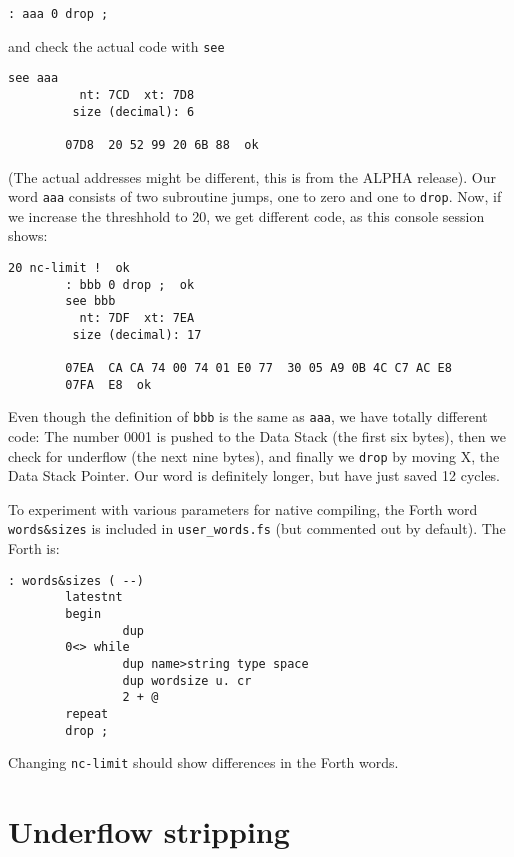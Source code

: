 \begin{lstlisting}[frame=single]
        : aaa 0 drop ;
\end{lstlisting}

\noindent and check the actual code with \texttt{see}

\begin{lstlisting}[frame=single]
        see aaa
          nt: 7CD  xt: 7D8
         size (decimal): 6

        07D8  20 52 99 20 6B 88  ok
\end{lstlisting}

\noindent (The actual addresses might be different, this is from the ALPHA release).  Our
word \texttt{aaa} consists of two subroutine jumps, one to zero and one to
\texttt{drop}. Now, if we increase the threshhold to 20, we get different code,
as this console session shows:

\begin{lstlisting}[frame=single]
        20 nc-limit !  ok
        : bbb 0 drop ;  ok
        see bbb
          nt: 7DF  xt: 7EA
         size (decimal): 17

        07EA  CA CA 74 00 74 01 E0 77  30 05 A9 0B 4C C7 AC E8
        07FA  E8  ok
\end{lstlisting}

\noindent Even though the definition of \texttt{bbb} is the same as \texttt{aaa}, we have
totally different code: The number 0001 is pushed to the Data Stack (the first
six bytes), then we check for underflow (the next nine bytes),
and finally we \texttt{drop} by moving X, the Data Stack
Pointer. Our word is definitely longer, but have just saved 12 cycles.

To experiment with various parameters for native compiling, the Forth word
\texttt{words\&sizes} is included in \texttt{user\_words.fs} (but commented out 
by default). The Forth is:

\begin{lstlisting}[frame=single]
: words&sizes ( --)
        latestnt
        begin
                dup
        0<> while
                dup name>string type space
                dup wordsize u. cr      
                2 + @
        repeat
        drop ;
\end{lstlisting}

\noindent Changing \texttt{nc-limit} should show differences in the Forth words.



\section{Underflow stripping}

